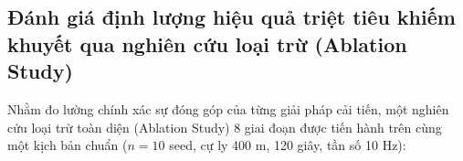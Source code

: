 \begin{table}[H]
\centering
\caption{Thống kê định lượng sai số bám bắt qua 10 giá trị khởi tạo ngẫu nhiên sau cải tiến}
\label{tab:multiseed-statistical-table}
\end{table}

\subsection{Đánh giá định lượng hiệu quả triệt tiêu khiếm khuyết qua nghiên cứu loại trừ (Ablation Study)}

\hspace{0.5cm} Nhằm đo lường chính xác sự đóng góp của từng giải pháp cải tiến, một nghiên cứu loại trừ toàn diện (Ablation Study) 8 giai đoạn được tiến hành trên cùng một kịch bản chuẩn ($n=10$ seed, cự ly 400 m, 120 giây, tần số 10 Hz):

